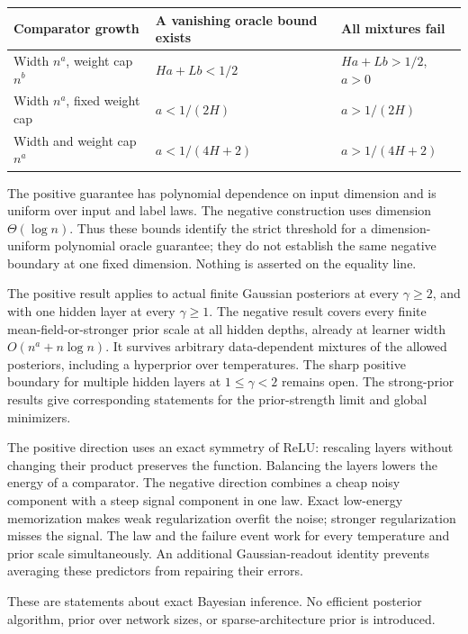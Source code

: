 \documentclass[11pt]{article}
\theoremstyle{remark}\newtheorem{remark}[theorem]{Remark}
\begin{document}
\begin{center}
\begin{tabular}{lll}
\toprule
Comparator growth & A vanishing oracle bound exists & All mixtures fail\\
\midrule
Width $n^a$, weight cap $n^b$ & $Ha+Lb<1/2$ & $Ha+Lb>1/2$, $a>0$\\
Width $n^a$, fixed weight cap & $a<1/(2H)$ & $a>1/(2H)$\\
Width and weight cap $n^a$ & $a<1/(4H+2)$ & $a>1/(4H+2)$\\
\bottomrule
\end{tabular}
\end{center}

The positive guarantee has polynomial dependence on input dimension and is uniform over input and label laws. The negative construction uses dimension $\Theta(\log n)$. Thus these bounds identify the strict threshold for a dimension-uniform polynomial oracle guarantee; they do not establish the same negative boundary at one fixed dimension. Nothing is asserted on the equality line.

The positive result applies to actual finite Gaussian posteriors at every $\gamma\ge2$, and with one hidden layer at every $\gamma\ge1$. The negative result covers every finite mean-field-or-stronger prior scale at all hidden depths, already at learner width $O(n^a+n\log n)$. It survives arbitrary data-dependent mixtures of the allowed posteriors, including a hyperprior over temperatures. The sharp positive boundary for multiple hidden layers at $1\le\gamma<2$ remains open. The strong-prior results give corresponding statements for the prior-strength limit and global minimizers.

The positive direction uses an exact symmetry of ReLU: rescaling layers without changing their product preserves the function. Balancing the layers lowers the energy of a comparator. The negative direction combines a cheap noisy component with a steep signal component in one law. Exact low-energy memorization makes weak regularization overfit the noise; stronger regularization misses the signal. The law and the failure event work for every temperature and prior scale simultaneously. An additional Gaussian-readout identity prevents averaging these predictors from repairing their errors.

These are statements about exact Bayesian inference. No efficient posterior algorithm, prior over network sizes, or sparse-architecture prior is introduced.
\end{document}
